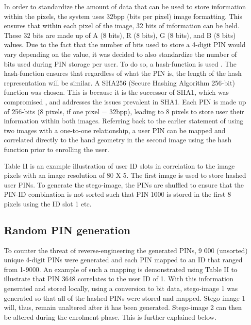 
In order to standardize the amount of data that can be used to store information within the pixels, the system uses 32bpp (bits per pixel) image formatting. This ensures that within each pixel of the image, 32 bits of information can be held. These 32 bits are made up of A (8 bits), R (8 bits), G (8 bits), and B (8 bits) values. Due to the fact that the number of bits used to store a 4-digit PIN would vary depending on the value, it was decided to also standardize the number of bits used during PIN storage per user. To do so, a hash-function is used \citep{Kashyap2016}. 
The hash-function ensures that regardless of what the PIN is, the length of the hash representation will be similar. A SHA256 (Secure Hashing Algorithm 256-bit) function was chosen. This is because it is the successor of SHA1, which was compromised \citep{Brandom}, and addresses the issues prevalent in SHA1.
Each PIN is made up of 256-bits (8 pixels, if one pixel = 32bpp), leading to 8 pixels to store user their information within both images. Referring back to the earlier statement of using two images with a one-to-one relationship, a user PIN can be mapped and correlated directly to the hand geometry in the second image using the hash function prior to enrolling the user.

Table II is an example illustration of user ID slots in correlation to the image pixels with an image resolution of 80 X 5. The first image is used to store hashed user PINs. 
To generate the stego-image, the PINs are shuffled to ensure that the PIN-ID combination is not sorted such that PIN 1000 is stored in the first 8 pixels using the ID slot 1 etc.

\subsection{Random PIN generation}

To counter the threat of reverse-engineering the generated PINs, 9 000 (unsorted) unique 4-digit PINs were generated and each PIN mapped to an ID that ranged from 1-9000. An example of such a mapping is demonstrated using Table II to illustrate that PIN 3648 correlates to the user ID of 1. With this information generated and stored locally, using a conversion to bit data, stego-image 1 was generated so that all of the hashed PINs were stored and mapped. Stego-image 1 will, thus, remain unaltered after it has been generated. Stego-image 2 can then be altered during the enrolment phase. This is further explained below.

